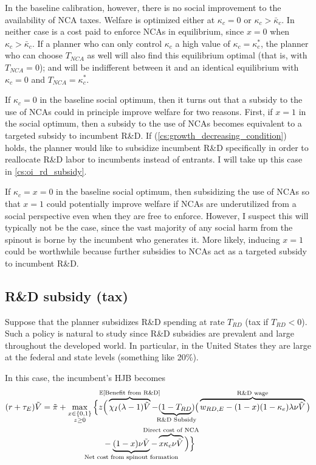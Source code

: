\documentclass[11pt,english]{article}
\theoremstyle{remark}
\begin{document}
In the baseline calibration, however, there is no social improvement to the availability of NCA taxes. Welfare is optimized either at $\kappa_c = 0$ or $\kappa_c > \bar{\kappa}_c$. In neither case is a cost paid to enforce NCAs in equilibrium, since $x = 0$ when $\kappa_c > \bar{\kappa}_c$. If a planner who can only control $\kappa_c$ a high value of $\kappa_c = \kappa_c^*$, the planner who can choose $T_{NCA}$ as well will also find this equilibrium optimal (that is, with $T_{NCA} = 0$); and will be indifferent between it and an identical equilibrium with $\kappa_c = 0$ and $T_{NCA} = \kappa_c^*$. 

If $\kappa_c = 0$ in the baseline social optimum, then it turns out that a subsidy to the use of NCAs could in principle improve welfare for two reasons. First, if $x = 1$ in the social optimum, then a subsidy to the use of NCAs becomes equivalent to a targeted subsidy to incumbent R\&D. If (\ref{cs:growth_decreasing_condition}) holds, the planner would like to subsidize incumbent R\&D specifically in order to reallocate R\&D labor to incumbents instead of entrants. I will take up this case in \autoref{cs:oi_rd_subsidy}.

If $\kappa_c = x = 0$ in the baseline social optimum, then subsidizing the use of NCAs so that $x = 1$ could potentially improve welfare if NCAs are underutilized from a social perspective even when they are free to enforce. However, I suspect this will typically not be the case, since the vast majority of any social harm from the spinout is borne by the incumbent who generates it. More likely, inducing $x = 1$ could be worthwhile because further subsidies to NCAs act as a targeted subsidy to incumbent R\&D.

\subsection{R\&D subsidy (tax)}

Suppose that the planner subsidizes R\&D spending at rate $T_{RD}$ (tax if $T_{RD} < 0$). Such a policy is natural to study since R\&D subsidies are prevalent and large throughout the developed world. In particular, in the United States they are large at the federal and state levels (something like 20\%).

In this case, the incumbent's HJB becomes
\begin{align}
	(r + \tau_E) \tilde{V} = \tilde{\pi} + \max_{\substack{x \in \{0,1\} \\ z \ge 0}} \Big\{z &\Big( \overbrace{\chi_I (\lambda - 1) \tilde{V}}^{\mathclap{\mathbb{E}[\textrm{Benefit from R\&D}]}}- (\underbrace{1-T_{RD}}_{\mathclap{\text{R\&D Subsidy}}}) \big( \overbrace{w_{RD,E} - (1-x)(1-\kappa_e)\lambda \nu \tilde{V}}^{\mathclap{\text{R\&D wage}}}\big) \label{eq:hjb_incumbent_RDsubsidy} \nonumber \\ 
	&-  \underbrace{(1-x) \nu \tilde{V}}_{\mathclap{\text{Net cost from spinout formation}}} - \overbrace{x \kappa_{c} \nu \tilde{V}}^{\mathclap{\text{Direct cost of NCA}}}\Big) \Big\} 
\end{align}
\end{document}
